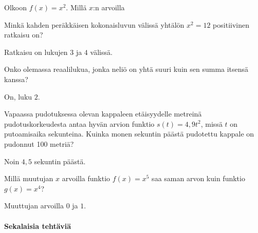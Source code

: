 \begin{tehtavasivu}
\begin{tehtava}
Olkoon $f(x)=x^2$. Millä $x$:n arvoilla
\begin{alakohdat}
\end{alakohdat}
\begin{vastaus}
\begin{alakohdat}
\end{alakohdat}
\end{vastaus}
\end{tehtava}

\begin{tehtava}
Minkä kahden peräkkäisen kokonaisluvun välissä yhtälön $x^2 = 12$ positiivinen ratkaisu on?
\begin{vastaus}
Ratkaisu on lukujen $3$ ja $4$ välissä.
\end{vastaus}
\end{tehtava}

\begin{tehtava}
Onko olemassa reaalilukua, jonka neliö on yhtä suuri kuin sen summa itsensä kanssa?
\begin{vastaus}
On, luku $ 2 $.
\end{vastaus}
\end{tehtava}


\begin{tehtava}
Vapaassa pudotuksessa olevan kappaleen etäisyydelle metreinä pudotuskorkeudesta antaa hyvän arvion funktio $ s(t)=4,9t^{2}$, missä $ t $ on putoamisaika sekunteina. Kuinka monen sekuntin päästä pudotettu kappale on pudonnut 100 metriä?
\begin{vastaus}
Noin $4,5$ sekuntin päästä.
\end{vastaus}
\end{tehtava}

\begin{tehtava}
Millä muutujan $x$ arvoilla funktio $ f(x)=x^{5}$ saa saman arvon kuin funktio $ g(x)=x^{4}$?
\begin{vastaus}
Muuttujan arvoilla $0$ ja $1$.
\end{vastaus}
\end{tehtava}

\paragraph*{Sekalaisia tehtäviä}


\end{tehtavasivu}
